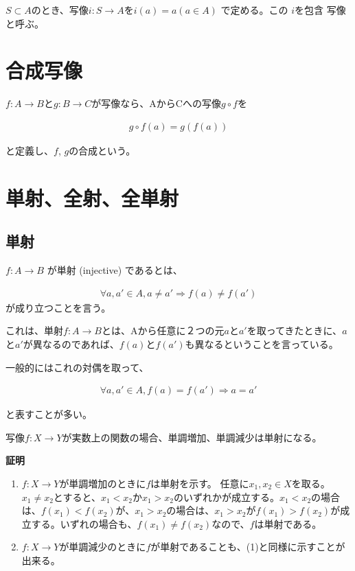 \documentclass[dvipdfmx,autodetect-engine]{jsarticle}
\begin{document}
$S \subset A$のとき、写像$i: S \to A$を$i(a) = a (a \in A)$ で定める。この $i$を包含
写像と呼ぶ。

\section{合成写像}

$f: A \to B$と$g: B \to C$が写像なら、AからCへの写像$g \circ f$を

\begin{eqnarray*}
g \circ f(a) = g(f(a))
\end{eqnarray*}

と定義し、$f$, $g$の合成という。

\section{単射、全射、全単射}

\subsection{単射}

$f: A \to B$ が単射 (injective) であるとは、

\begin{eqnarray*}
\forall a, a' \in A, a \neq a' \Rightarrow f(a) \neq f(a')
\end{eqnarray*}
が成り立つことを言う。

これは、単射$f: A \to B$とは、Aから任意に２つの元$a$と$a'$を取ってきたときに、$a
$と$a'$が異なるのであれば、$f(a)$と$f(a')$も異なるということを言っている。

一般的にはこれの対偶を取って、

\begin{eqnarray*}
\forall a, a' \in A, f(a) = f(a') \Rightarrow a = a'
\end{eqnarray*}

と表すことが多い。

\prop 写像$f: X \to Y$が実数上の関数の場合、単調増加、単調減少は単射になる。

{\bf 証明}

\begin{enumerate}
\renewcommand{\labelenumi}{(\arabic{enumi})}
\item $f: X \to Y$が単調増加のときに$f$は単射を示す。
任意に$x_1, x_2 \in X$を取る。$x_1 \neq x_2$とすると、$x_1 < x_2$か$x_1 > x_2$のいずれかが成立する。$x_1 < x_2$の場合は、$f(x_1) < f(x_2)$が、$x_1 > x_2$の場合は、$x_1 > x_2$が$f(x_1) > f(x_2)$が成立する。いずれの場合も、$f(x_1) \neq f(x_2)$なので、$f$は単射である。
\item $f: X \to Y$が単調減少のときに$f$が単射であることも、(1)と同様に示すことが出来る。
\end{enumerate}
\end{document}
